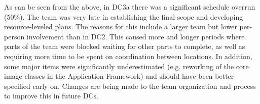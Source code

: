 As can be seen from the above, in DC3a there was  a significant schedule overrun (50\%).
The team was very late in establishing the final scope 
and developing resource-leveled plans. The reasons for this include a larger team but
 lower per-person involvement than in DC2.
This caused more and longer periods where parts of the team were blocked
waiting for other parts to complete, as well as requiring more time to be spent 
on coordination between locations.
In addition, some major items were significantly underestimated (e.g. reworking of the core image classes
in the Application Framework) and should have been better specified early on.
Changes are being made to the team organization and process to improve this in future DCs.
